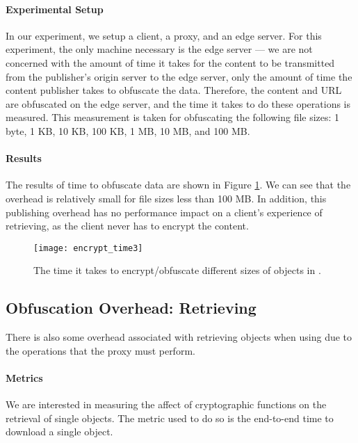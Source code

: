 \paragraph{Experimental Setup}
In our experiment, we setup a client, a proxy, and an edge server. For this experiment, the only machine necessary is 
the edge server --- we are not concerned with the amount of time it takes for the content to be transmitted from 
the publisher's origin server to the edge server, only the amount of time the content publisher takes to obfuscate the data.  Therefore, 
the content and URL are obfuscated on the edge server, and the time it takes to do these operations is measured.  This 
measurement is taken for obfuscating the following file sizes: 1 byte, 1 KB, 10 KB, 100 KB, 1 MB, 10 MB, and 100 MB. \\

\paragraph{Results}
The results of time to obfuscate data are shown in Figure \ref{fig:encrypt_time}.  We can see that the overhead 
is relatively small for file sizes less than 100 MB.  In addition, this publishing overhead has no performance impact 
on a client's experience of retrieving, as the client never has to encrypt the content.  

\begin{figure}[t]
\centering
\texttt{[image: encrypt\_time3]}
\caption{The time it takes to encrypt/obfuscate different sizes of objects in \system{}.}
\label{fig:encrypt_time}
\end{figure}

\subsection{Obfuscation Overhead: Retrieving}
There is also some overhead associated with retrieving objects when using \system{} due to the operations that 
the proxy must perform.  \\

\paragraph{Metrics}
We are interested in measuring the affect of cryptographic functions on the retrieval of single 
objects.  The metric used to do so is the end-to-end time to download a single object.  \\

